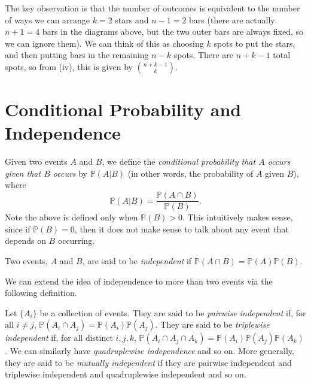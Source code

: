 The key observation is that the number of outcomes is equivalent to the number of ways we can arrange $k = 2$ stars and $n - 1 = 2$ bars (there are actually $n + 1 = 4$ bars in the diagrams above, but the two outer bars are always fixed, so we can ignore them). We can think of this as choosing $k$ spots to put the stars, and then putting bars in the remaining $n - k$ spots. There are $n + k - 1$ total spots, so from (iv), this is given by $\binom{n+k-1}{k}$.

\section{Conditional Probability and Independence}

\begin{definition}
    Given two events $A$ and $B$, we define the \emph{conditional probability that $A$ occurs given that $B$ occurs} by $\mathbb{P}(A|B)$ (in other words, the probability of $A$ given $B$), where
    \[
        \mathbb{P}(A|B) = \frac{\mathbb{P}(A \cap B)}{\mathbb{P}(B)}
    .\]
    Note the above is defined only when $\mathbb{P}(B) > 0$. This intuitively makes sense, since if $\mathbb{P}(B) = 0$, then it does not make sense to talk about any event that depends on $B$ occurring.
\end{definition}

\begin{definition}
    Two events, $A$ and $B$, are said to be \emph{independent} if $\mathbb{P}(A \cap B) = \mathbb{P}(A)\mathbb{P}(B)$.
\end{definition}

We can extend the idea of independence to more than two events via the following definition.

\begin{definition}
    Let $\{A_i\}$ be a collection of events. They are said to be \emph{pairwise independent} if, for all $i \neq j$, $\mathbb{P}(A_i \cap A_j) = \mathbb{P}(A_i)\mathbb{P}(A_j)$. They are said to be \emph{triplewise independent} if, for all distinct $i, j, k$, $\mathbb{P}(A_i \cap A_j \cap A_k) = \mathbb{P}(A_i)\mathbb{P}(A_j)\mathbb{P}(A_k)$. We can similarly have \emph{quadruplewise independence} and so on. More generally, they are said to be \emph{mutually independent} if they are pairwise independent and triplewise independent and quadruplewise independent and so on.
\end{definition}

